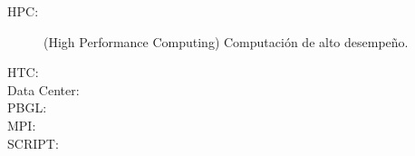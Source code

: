 \begin{description}
	\item [HPC:] (High Performance Computing) Computación de alto desempeño.
	\item [HTC:]
	\item [Data Center:]
	\item [PBGL:]
	\item [MPI:]
	\item [SCRIPT:]
\end{description}